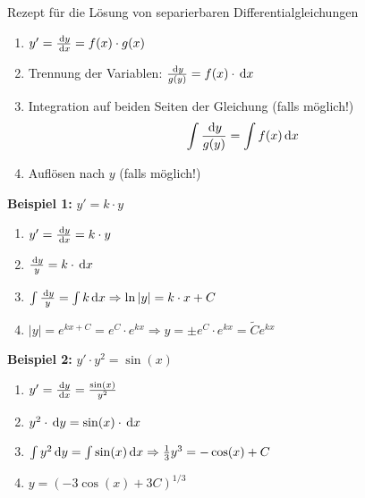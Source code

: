 \begin{subbox}{Rezept für die Lösung von separierbaren Differentialgleichungen}
    \begin{enumerate}
        \item $y' = \frac{\,\mathrm{d}y}{\,\mathrm{d}x} = f(x) \cdot g(x)$
        \item Trennung der Variablen: $\frac{\,\mathrm{d}y}{g(y)} = f(x) \cdot \,\mathrm{d}x$
        \item Integration auf beiden Seiten der Gleichung (falls möglich!) \[\int \frac{\,\mathrm{d}y}{g(y)} = \int f(x) \,\mathrm{d}x\]
        \item Auflösen nach $y$ (falls möglich!)
    \end{enumerate}
\end{subbox}

\begin{multicols}{2}
    \textbf{Beispiel 1:} $y' = k \cdot y$
    \begin{enumerate}
        \item $y' = \frac{\,\mathrm{d}y}{\,\mathrm{d}x} = k \cdot y$
        \item $\frac{\,\mathrm{d}y}{y} = k \cdot \,\mathrm{d}x$
        \item $\int \frac{\,\mathrm{d}y}{y} = \int k \,\mathrm{d}x \Rightarrow \ln |y| = k \cdot x + C$
        \item $|y| = e^{kx + C} = e^C \cdot e^{kx} \Rightarrow y = \pm e^C \cdot e^{kx} = \tilde{C} e^{kx}$
    \end{enumerate}

    \textbf{Beispiel 2:} $y' \cdot y^2 = \sin(x)$
    \begin{enumerate}
        \item $y' = \frac{\,\mathrm{d}y}{\,\mathrm{d}x} = \frac{\sin(x)}{y^2}$
        \item $y^2 \cdot \,\mathrm{d}y = \sin(x) \cdot \,\mathrm{d}x$
        \item $\int y^2 \,\mathrm{d}y = \int \sin(x) \,\mathrm{d}x \Rightarrow \frac{1}{3} y^3 = -\cos(x) + C$
        \item $y = (-3\cos(x) + 3C)^{1/3}$
    \end{enumerate}
\end{multicols}

\vspace{-\baselineskip}
\hrulefill

